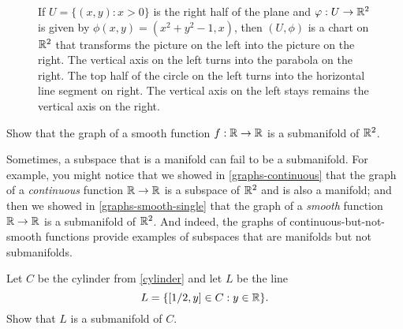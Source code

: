\begin{exercise}
\begin{figure}
\begin{center}
		\end{center}
		\caption{If $U = \{(x,y) : x > 0\}$ is the right half of the plane and $\varphi : U \to \mathbb{R}^2$ is given by $\phi(x,y) = (x^2 + y^2 - 1, x)$, then $(U, \phi)$ is a chart on $\mathbb{R}^2$ that transforms the picture on the left into the picture on the right. The vertical axis on the left turns into the parabola on the right. The top half of the circle on the left turns into the horizontal line segment on right. The vertical axis on the left stays remains the vertical axis on the right.}  \label{circle-submanifold-picture}
	\end{figure}
\end{exercise}

\begin{exercise} \label{graphs-smooth-single}
	Show that the graph of a smooth function $f : \mathbb{R} \to \mathbb{R}$ is a submanifold of $\mathbb{R}^2$. 
\end{exercise}

\begin{caution}
	Sometimes, a subspace that is a manifold can fail to be a submanifold. For example, you might notice that we showed in \cref{graphs-continuous} that the graph of a \emph{continuous} function $\mathbb{R} \to \mathbb{R}$ is a subspace of $\mathbb{R}^2$ and is also a manifold; and then we showed in \cref{graphs-smooth-single} that the graph of a \emph{smooth} function $\mathbb{R} \to \mathbb{R}$ is a submanifold of $\mathbb{R}^2$. And indeed, the graphs of continuous-but-not-smooth functions provide examples of subspaces that are manifolds but not submanifolds. 
\end{caution}

\begin{exercise}
	Let $C$ be the cylinder from \cref{cylinder} and let $L$ be the line \[ L = \{ [1/2, y] \in C : y \in \mathbb{R} \}. \] Show that $L$ is a submanifold of $C$. 
\end{exercise}

